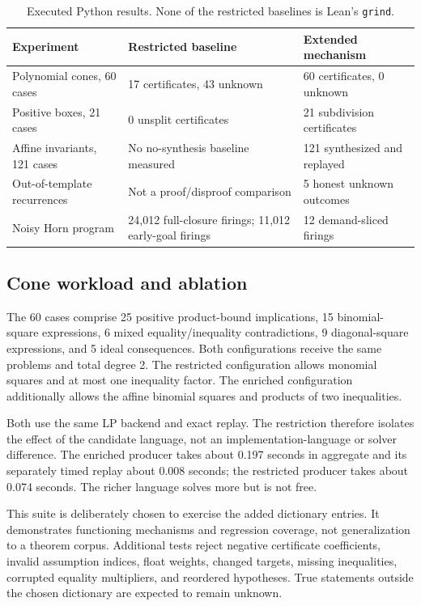 \documentclass[11pt,a4paper]{article}
\newcommand{\grind}{\texttt{grind}}
\begin{document}
\begin{table}[htbp]
\centering\small
\begin{tabularx}{\textwidth}{@{}p{42mm}XX@{}}
\toprule
\textbf{Experiment} & \textbf{Restricted baseline} & \textbf{Extended mechanism}\\
\midrule
Polynomial cones, 60 cases & 17 certificates, 43 unknown & 60 certificates, 0 unknown\\
Positive boxes, 21 cases & 0 unsplit certificates & 21 subdivision certificates\\
Affine invariants, 121 cases & No no-synthesis baseline measured & 121 synthesized and replayed\\
Out-of-template recurrences & Not a proof/disproof comparison & 5 honest unknown outcomes\\
Noisy Horn program & 24,012 full-closure firings; 11,012 early-goal firings & 12 demand-sliced firings\\
\bottomrule
\end{tabularx}
\caption{Executed Python results. None of the restricted baselines is Lean's \grind.}
\end{table}

\subsection{Cone workload and ablation}
The 60 cases comprise 25 positive product-bound implications, 15 binomial-square expressions, 6 mixed equality/inequality contradictions, 9 diagonal-square expressions, and 5 ideal consequences. Both configurations receive the same problems and total degree 2. The restricted configuration allows monomial squares and at most one inequality factor. The enriched configuration additionally allows the affine binomial squares and products of two inequalities.

Both use the same LP backend and exact replay. The restriction therefore isolates the effect of the candidate language, not an implementation-language or solver difference. The enriched producer takes about 0.197 seconds in aggregate and its separately timed replay about 0.008 seconds; the restricted producer takes about 0.074 seconds. The richer language solves more but is not free.

This suite is deliberately chosen to exercise the added dictionary entries. It demonstrates functioning mechanisms and regression coverage, not generalization to a theorem corpus. Additional tests reject negative certificate coefficients, invalid assumption indices, float weights, changed targets, missing inequalities, corrupted equality multipliers, and reordered hypotheses. True statements outside the chosen dictionary are expected to remain unknown.
\end{document}

